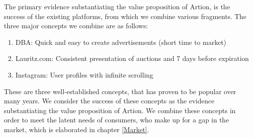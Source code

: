 The primary evidence substantiating the value proposition of Artion, is the success of the existing platforms, from which we combine various fragments. The three major concepts we combine are as follows: 
\begin{enumerate}
    \item DBA: Quick and easy to create advertisements (short time to market)
    \item Lauritz.com: Consistent presentation of auctions and 7 days before expiration
    \item Instagram: User profiles with infinite scrolling 
\end{enumerate}
These are three well-established concepts, that has proven to be popular over many years. We consider the success of these concepts as the evidence substantiating the value proposition of Artion. We combine these concepts in order to meet the latent needs of consumers, who make up for a gap in the market, which is elaborated in chapter \ref{Market}.
